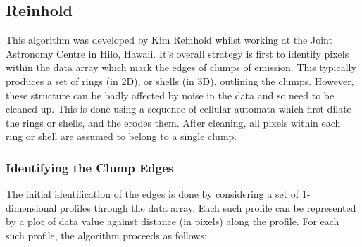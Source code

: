 \documentclass[twoside,11pt]{article}
\newcommand{\xlabel}[1]{}
\renewcommand{\_}{\texttt{\symbol{95}}}
\begin{document}
\subsection{\xlabel{reinhold}Reinhold}
This algorithm was developed by Kim Reinhold whilst working at the Joint
Astronomy Centre in Hilo, Hawaii. It's overall strategy is first to
identify pixels within the data array which mark the edges of clumps of
emission. This typically produces a set of rings (in 2D), or shells (in 3D),
outlining the clumps. However, these structure can be badly affected by
noise in the data and so need to be cleaned up. This is done using a
sequence of cellular automata which first dilate the rings or shells, and
the erodes them. After cleaning, all pixels within each ring or shell
are assumed to belong to a single clump.

\subsubsection{Identifying the Clump Edges}
The initial identification of the edges is done by considering a set of
1-dimensional profiles through the data array. Each such profile can be
represented by a plot of data value against distance (in pixels) along the 
profile. For each such profile, the algorithm proceeds as follows:
\end{document}
